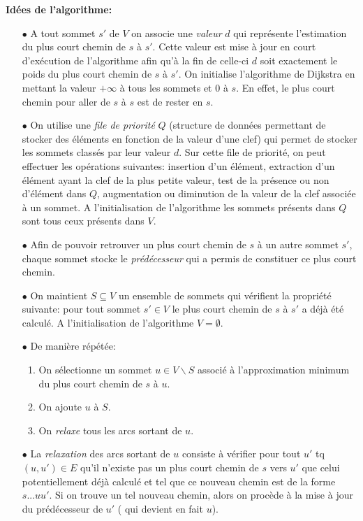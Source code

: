 \noindent \textbf{Idées de l'algorithme:}\\
\begin{enumerate}
	
	\item[$\bullet$] A tout sommet $s'$ de $V$ on associe une \textit{valeur} $d$ qui représente l'estimation du plus court chemin de $s$ à $s'$. Cette valeur est mise à jour en court d'exécution de l'algorithme afin qu'à la fin de celle-ci $d$ soit exactement le poids du plus court chemin de $s$ à $s'$. On initialise l'algorithme de Dijkstra en mettant la valeur $+\infty$ à tous les sommets et $0$ à $s$. En effet, le plus court chemin pour aller de $s$ à $s$ est de rester en $s$.
	
	\item[$\bullet$] On utilise une \textit{file de priorité} $Q$ (structure de données permettant de stocker des éléments en fonction de la valeur d'une clef) qui permet de stocker les sommets classés par leur valeur $d$. Sur cette file de priorité, on peut effectuer les opérations suivantes: insertion d'un élément, extraction d'un élément ayant la clef de la plus petite valeur, test de la présence ou non d'élément dans $Q$, augmentation ou diminution de la valeur de la clef associée à un sommet. A l'initialisation de l'algorithme les sommets présents dans $Q$ sont tous ceux présents dans $V$.
	
	\item[$\bullet$] Afin de pouvoir retrouver un plus court chemin de $s$ à un autre sommet $s'$, chaque sommet stocke le \textit{prédécesseur} qui a permis de constituer ce plus court chemin.
	
	\item[$\bullet$] On maintient $S \subseteq V$ un ensemble de sommets qui vérifient la propriété suivante: pour tout sommet $s'\in V$ le plus court chemin de $s$ à $s'$ a déjà été calculé. A l'initialisation de l'algorithme $V = \emptyset$.
	
	\item[$\bullet$]De manière répétée: \begin{enumerate}
										\item On sélectionne un sommet $u \in V \backslash S$ associé à l'approximation minimum du plus court chemin de $s$ à $u$.
										\item On ajoute $u$ à $S$.
										\item On \textit{relaxe} tous les arcs sortant de $u$.
									\end{enumerate}
	\item[$\bullet$] La \textit{relaxation} des arcs sortant de $u$ consiste à vérifier pour tout $u'$ tq $(u,u')\in E$ qu'il n'existe pas un plus court chemin de $s$ vers $u'$ que celui potentiellement déjà calculé et tel que ce nouveau chemin est de la forme $s ... uu'$. Si on trouve un tel nouveau chemin, alors on procède à la mise à jour du prédécesseur de $u'$ ( qui devient en fait $u$).
\end{enumerate}
$\text{}$\\

